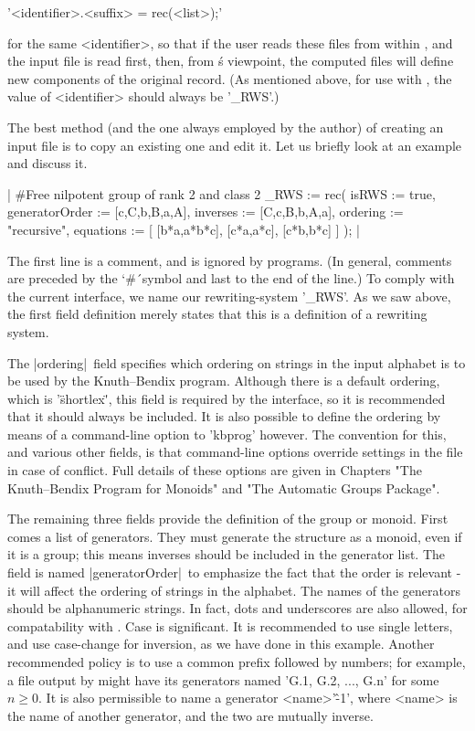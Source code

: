 '<identifier>.<suffix> \:= rec(<list>);'

for the same <identifier>, so that if the user reads these files from
within {\GAP}, and the input file is read first, then, from {\GAP}\'s
viewpoint, the computed files will define new components of the original
record. (As mentioned above, for use with {\GAP}, the value of
<identifier> should always be '\_RWS'.)

The best method (and the one always employed by the author)
of creating an input file is to copy an existing one and edit it.
Let us briefly look at an example and discuss it.

|
#Free nilpotent group of rank 2 and class 2
_RWS := rec(
           isRWS := true,
  generatorOrder := [c,C,b,B,a,A],
        inverses := [C,c,B,b,A,a],
        ordering := "recursive",
       equations := [
         [b*a,a*b*c], [c*a,a*c], [c*b,b*c]
       ]
);
|

The first line is a comment, and is ignored by programs. (In general,
comments are preceded by the `\#\'\ symbol and last to the end of the line.)
To comply with the current {\GAP} interface, we name our rewriting-system
'\_RWS'.
As we saw above, the first field definition merely states that this is a
definition of a rewriting system.

The |ordering|\ field specifies which
ordering on strings in the input alphabet is to be used by the Knuth--Bendix
program. Although there is a default ordering, which is '\"shortlex\"',
this field is required by the {\GAP} interface, so it is recommended that
it should always be included.
It is also possible
to define the ordering by means of a command-line option to 'kbprog'
however. The convention for this, and various other fields, is that
command-line options override settings in the file in case of conflict.
Full details of these options are given in Chapters
"The Knuth--Bendix Program for Monoids" and "The Automatic Groups Package".

The remaining three fields provide the definition of the group or monoid.
First comes a list of generators. They must generate the structure as a monoid,
even if it is a group; this means inverses should be included in the generator
list. The field is named |generatorOrder|\ to emphasize the fact that the
order is relevant - it will affect the ordering of strings in the alphabet.
The names of the generators should be alphanumeric strings. In fact,
dots and underscores are also allowed, for compatability with {\GAP}.
Case is significant. It is recommended to use single letters, and use
case-change for inversion, as we have done in this example. Another
recommended policy is to use a common prefix followed by numbers; for
example, a file output by {\GAP} might have its generators named
'G.1, G.2, ..., G.n' for some $n \ge 0$. It is also permissible to name a
generator <name>'\^-1', where <name> is the name of another generator, and
the two are mutually inverse.


